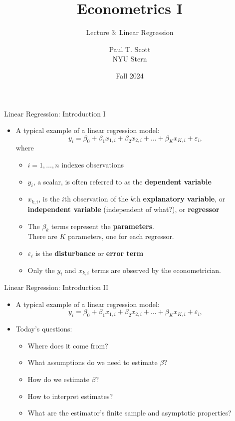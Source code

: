 \documentclass[english,xcolor={dvipsnames},aspectratio=169]{beamer}
\begin{document}
\title[L3 - Linear Regression]{ Econometrics I}
\subtitle{Lecture 3: Linear Regression}
\author{Paul T. Scott \\NYU Stern}
\date{Fall 2024}
\maketitle



\begin{frame}{Linear Regression: Introduction I}
\begin{itemize}
	\item A typical example of a linear regression model:
	\begin{equation*}
		y_i = \beta_0 + \beta_1 x_{1,i} +  \beta_2 x_{2,i} + \dots +  \beta_K x_{K,i} + \varepsilon_i,
	\end{equation*}
	where 
	\begin{itemize}
		\item<1-> $i=1,\dots,n$ indexes observations
		\smallskip
		\item<2-> $y_{i}$, a scalar, is often referred to as the {\bf dependent variable}
		\smallskip
		\item<3-> $x_{k,i}$, is the $i$th observation of the $k$th {\bf explanatory variable},
		 or {\bf independent variable} (independent of what?), or  {\bf regressor}
		\smallskip
		\item<4-> The $\beta_{k}$ terms represent the {\bf  parameters}. \\
		There are $K$ parameters, one	for each regressor.

		\smallskip
		\item<5-> $\varepsilon_{i}$ is the {\bf disturbance} or {\bf error term}
\smallskip
		\item<6-> Only the $y_{i}$ and $x_{k,i}$ terms are observed by the econometrician.
	\end{itemize}
\end{itemize}
\end{frame}


\begin{frame}{Linear Regression: Introduction II}
\begin{itemize}
	\item A typical example of a linear regression model:
	\begin{equation*}
		y_i = \beta_0 + \beta_1 x_{1,i} +  \beta_2 x_{2,i} + \dots +  \beta_K x_{K,i} + \varepsilon_i,
	\end{equation*}
	\item Today's questions: 
	\begin{itemize}
		\item Where does it come from? 
		\item What assumptions do we need to estimate $\beta$?
		\item How do we estimate $\beta$?
		\item How to interpret estimates? 
		\item What are the estimator's finite sample and asymptotic properties? 
	\end{itemize}
\end{itemize}
\end{frame}
\end{document}
